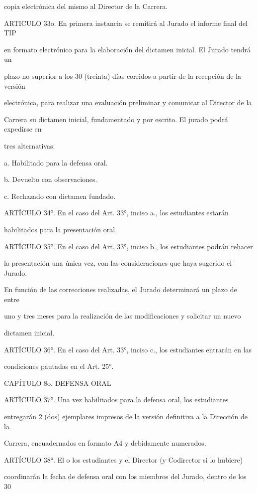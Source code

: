 \documentclass[a4paper,12pt]{article}
\begin{document}
copia electrónica del mismo al Director de la Carrera.

ARTICULO 33o. En primera instancia se remitirá al Jurado el informe final del TIP

en formato electrónico para la elaboración del dictamen inicial. El Jurado tendrá un

plazo no superior a los 30 (treinta) días corridos a partir de la recepción de la versión

electrónica, para realizar una evaluación preliminar y comunicar al Director de la

Carrera su dictamen inicial, fundamentado y por escrito. El jurado podrá expedirse en

tres alternativas:

a. Habilitado para la defensa oral.

b. Devuelto con observaciones.

c. Rechazado con dictamen fundado.

ARTÍCULO 34°. En el caso del Art. 33°, inciso a., los estudiantes estarán

habilitados para la presentación oral. 

ARTÍCULO 35°. En el caso del Art. 33°, inciso b., los estudiantes podrán rehacer

la presentación una única vez, con las consideraciones que haya sugerido el Jurado.

En función de las correcciones realizadas, el Jurado determinará un plazo de entre

uno y tres meses para la realización de las modificaciones y solicitar un nuevo

dictamen inicial.

ARTÍCULO 36°. En el caso del Art. 33°, inciso c., los estudiantes entrarán en las

condiciones pautadas en el Art. 25°. 

CAPÍTULO 8o. DEFENSA ORAL

ARTÍCULO 37°. Una vez habilitados para la defensa oral, los estudiantes

entregarán 2 (dos) ejemplares impresos de la versión definitiva a la Dirección de la

Carrera, encuadernados en formato A4 y debidamente numerados.

ARTÍCULO 38°. El o los estudiantes y el Director (y Codirector si lo hubiere)

coordinarán la fecha de defensa oral con los miembros del Jurado, dentro de los 30
\end{document}
